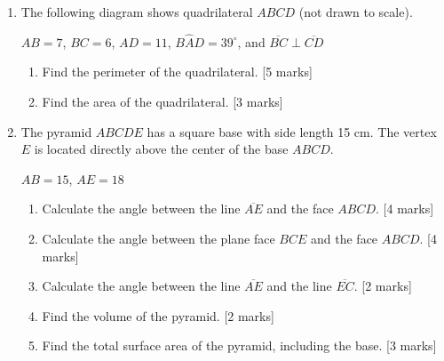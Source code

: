 \documentclass[12pt, twoside]{article}
\begin{document}
\begin{enumerate}
\item The following diagram shows quadrilateral $ABCD$ (not drawn to scale).
  \begin{center}
    \end{center} 
    $AB=7$, $BC=6$, $AD=11$, $B\hat{A}D=39^\circ$, and $\overline{BC} \perp \overline{CD}$
    \begin{enumerate}
      \item Find the perimeter of the quadrilateral. \hfill [5 marks]
      \item Find the area of the quadrilateral. \hfill [3 marks]
    \end{enumerate}


\newpage
\item The pyramid $ABCDE$ has a square base with side length 15 cm. The vertex $E$ is located directly above the center of the base $ABCD$.
\begin{center}
  \end{center}

  $AB=15$, $AE=18$
  \begin{enumerate}
    \item Calculate the angle between the line $\overline{AE}$ and the face $ABCD$. \hfill [4 marks]
    \item Calculate the angle between the plane face $BCE$ and the face $ABCD$. \hfill [4 marks]
    \item Calculate the angle between the line $\overline{AE}$ and the line $\overline{EC}$. \hfill [2 marks]
    \item Find the volume of the pyramid. \hfill [2 marks]
    \item Find the total surface area of the pyramid, including the base. \hfill [3 marks]
  \end{enumerate}

\end{enumerate}
\end{document}

